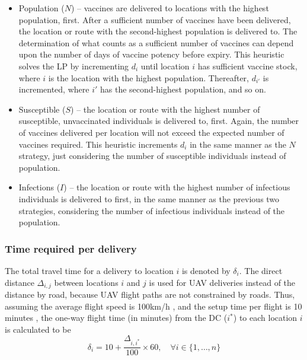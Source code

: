 \begin{itemize}
    \item Population ($N$) -- vaccines are delivered to locations with the highest population, first. After a sufficient number of vaccines have been delivered, the location or route with the second-highest population is delivered to. The determination of what counts as a sufficient number of vaccines can depend upon the number of days of vaccine potency before expiry. This heuristic solves the LP by incrementing $d_{i}$ until location $i$ has sufficient vaccine stock, where $i$ is the location with the highest population. Thereafter, $d_{i'}$ is incremented, where $i'$ has the second-highest population, and so on.
    \item Susceptible ($S$) -- the location or route with the highest number of susceptible, unvaccinated individuals is delivered to, first. Again, the number of vaccines delivered per location will not exceed the expected number of vaccines required. This heuristic increments $d_{i}$ in the same manner as the $N$ strategy, just considering the number of susceptible individuals instead of population.
    \item Infections ($I$) -- the location or route with the highest number of infectious individuals is delivered to first, in the same manner as the previous two strategies, considering the number of infectious individuals instead of the population.
\end{itemize}

\subsubsection{Time required per delivery}
\label{sec:dro_dels}
The total travel time for a delivery to location $i$ is denoted by $\delta_{i}$.
The direct distance $\Delta_{i,j}$ between locations $i$ and $j$ is used for UAV deliveries instead of the distance by road, because UAV flight paths are not constrained by roads. Thus, assuming the average flight speed is 100km/h \cite{service_contract_2018, zipline_impact}, and the setup time per flight is 10 minutes \cite{ackerman_koziol_2019}, the one-way flight time (in minutes) from the DC ($i^{*}$) to each location $i$ is calculated to be $$\delta_{i} = 10 + \frac{\Delta_{i,i^{*}}}{100} \times 60, \quad \forall{i} \in \{1, \dots, n \}$$ 

